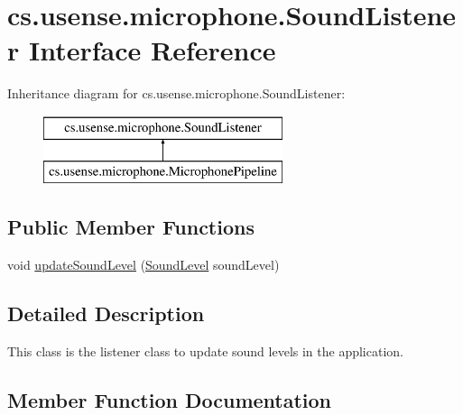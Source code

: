 \hypertarget{interfacecs_1_1usense_1_1microphone_1_1_sound_listener}{}\section{cs.\+usense.\+microphone.\+Sound\+Listener Interface Reference}
\label{interfacecs_1_1usense_1_1microphone_1_1_sound_listener}
Inheritance diagram for cs.\+usense.\+microphone.\+Sound\+Listener\+:\begin{figure}[H]
\begin{center}
\leavevmode
\includegraphics[height=2.000000cm]{interfacecs_1_1usense_1_1microphone_1_1_sound_listener}
\end{center}
\end{figure}
\subsection*{Public Member Functions}
\begin{DoxyCompactItemize}
\item 
void \hyperlink{interfacecs_1_1usense_1_1microphone_1_1_sound_listener_a25ac8f82a81248b62dd9931fa5ae4d78}{update\+Sound\+Level} (\hyperlink{classcs_1_1usense_1_1microphone_1_1_sound_level}{Sound\+Level} sound\+Level)
\end{DoxyCompactItemize}


\subsection{Detailed Description}
This class is the listener class to update sound levels in the application. 

\subsection{Member Function Documentation}
\hypertarget{interfacecs_1_1usense_1_1microphone_1_1_sound_listener_a25ac8f82a81248b62dd9931fa5ae4d78}{}
